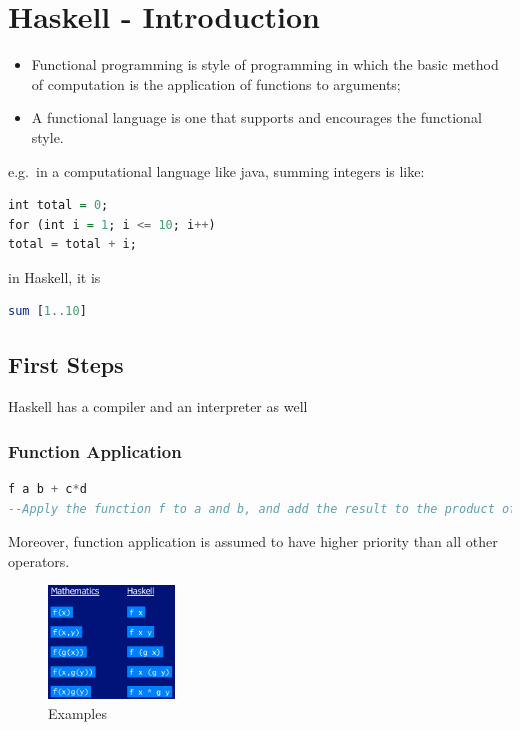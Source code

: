 \hypertarget{haskell}{%
\section{Haskell - Introduction}\label{haskell}}

\begin{itemize}
\tightlist
\item
  Functional programming is style of programming in which the basic
  method of computation is the application of functions to arguments;
\item
  A functional language is one that supports and encourages the
  functional style.
\end{itemize}

e.g.~in a computational language like java, summing integers is like:

\begin{lstlisting}[language=Haskell]
int total = 0;
for (int i = 1; i <= 10; i++)
total = total + i;
\end{lstlisting}

in Haskell, it is

\begin{lstlisting}[language=Haskell]
sum [1..10]
\end{lstlisting}

\hypertarget{first-steps}{%
\subsection{First Steps}\label{first-steps}}

Haskell has a compiler and an interpreter as well

\hypertarget{function-application}{%
\subsubsection{Function Application}\label{function-application}}

\begin{lstlisting}[language=Haskell]
f a b + c*d
--Apply the function f to a and b, and add the result to the product of c and d.
\end{lstlisting}

Moreover, function application is assumed to have higher priority than
all other operators.

\begin{figure}[H]
\centering
\includegraphics[width=0.3\textwidth]{figures/haskellMath.png}
\caption{Examples}
\end{figure}

